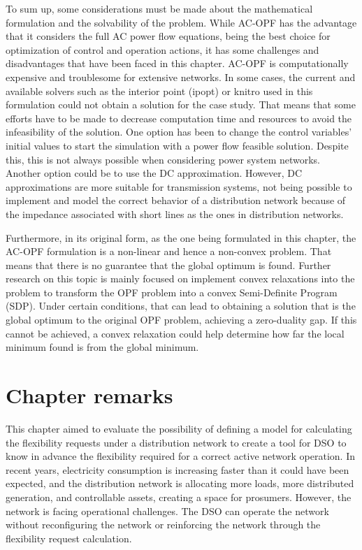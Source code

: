 To sum up, some considerations must be made about the mathematical formulation and the solvability of the problem. While AC-OPF has the advantage that it considers the full AC power flow equations, being the best choice for optimization of control and operation actions, it has some challenges and disadvantages that have been faced in this chapter. AC-OPF is computationally expensive and troublesome for extensive networks. In some cases, the current and available solvers such as the interior point (ipopt) or knitro used in this formulation could not obtain a solution for the case study. That means that some efforts have to be made to decrease computation time and resources to avoid the infeasibility of the solution. One option has been to change the control variables' initial values to start the simulation with a power flow feasible solution. Despite this, this is not always possible when considering power system networks. Another option could be to use the DC approximation. However, DC approximations are more suitable for transmission systems, not being possible to implement and model the correct behavior of a distribution network because of the impedance associated with short lines as the ones in distribution networks. 

Furthermore, in its original form, as the one being formulated in this chapter, the AC-OPF formulation is a non-linear and hence a non-convex problem. That means that there is no guarantee that the global optimum is found. Further research on this topic is mainly focused on implement convex relaxations into the problem to transform the OPF problem into a convex Semi-Definite Program (SDP). Under certain conditions, that can lead to obtaining a solution that is the global optimum to the original OPF problem, achieving a zero-duality gap. If this cannot be achieved, a convex relaxation could help determine how far the local minimum found is from the global minimum.  


\newpage
\section{Chapter remarks}
This chapter aimed to evaluate the possibility of defining a model for calculating the flexibility requests under a distribution network to create a tool for DSO to know in advance the flexibility required for a correct active network operation. In recent years, electricity consumption is increasing faster than it could have been expected, and the distribution network is allocating more loads, more distributed generation, and controllable assets, creating a space for prosumers. However, the network is facing operational challenges. The DSO can operate the network without reconfiguring the network or reinforcing the network through the flexibility request calculation.

